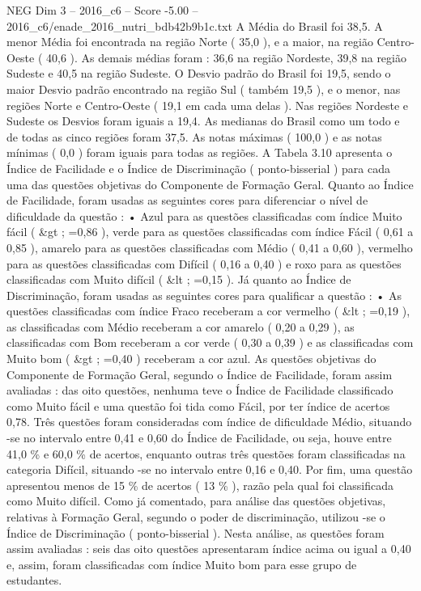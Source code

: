 \begin{textsample}{NEG Dim 3 – 2016\_c6 – Score -5.00 – 2016\_c6/enade\_2016\_nutri\_bdb42b9b1c.txt}
A Média do Brasil foi 38,5.
A menor Média foi encontrada na região Norte ( 35,0 ), e a maior, na região Centro-Oeste ( 40,6 ).
As demais médias foram : 36,6 na região Nordeste, 39,8 na região Sudeste e 40,5 na região Sudeste.
O Desvio padrão do Brasil foi 19,5, sendo o maior Desvio padrão encontrado na região Sul ( também 19,5 ), e o menor, nas regiões Norte e Centro-Oeste ( 19,1 em cada uma delas ).
Nas regiões Nordeste e Sudeste os Desvios foram iguais a 19,4.
As medianas do Brasil como um todo e de todas as cinco regiões foram 37,5.
As notas máximas ( 100,0 ) e as notas mínimas ( 0,0 ) foram iguais para todas as regiões.
A Tabela 3.10 apresenta o Índice de Facilidade e o Índice de Discriminação ( ponto-bisserial ) para cada uma das questões objetivas do Componente de Formação Geral.
Quanto ao Índice de Facilidade, foram usadas as seguintes cores para diferenciar o nível de dificuldade da questão : • Azul para as questões classificadas com índice Muito fácil ( \&gt ; =0,86 ), verde para as questões classificadas com índice Fácil ( 0,61 a 0,85 ), amarelo para as questões classificadas com Médio ( 0,41 a 0,60 ), vermelho para as questões classificadas com Difícil ( 0,16 a 0,40 ) e roxo para as questões classificadas com Muito difícil ( \&lt ; =0,15 ).
Já quanto ao Índice de Discriminação, foram usadas as seguintes cores para qualificar a questão : • As questões classificadas com índice Fraco receberam a cor vermelho ( \&lt ; =0,19 ), as classificadas com Médio receberam a cor amarelo ( 0,20 a 0,29 ), as classificadas com Bom receberam a cor verde ( 0,30 a 0,39 ) e as classificadas com Muito bom ( \&gt ; =0,40 ) receberam a cor azul.
As questões objetivas do Componente de Formação Geral, segundo o Índice de Facilidade, foram assim avaliadas : das oito questões, nenhuma teve o Índice de Facilidade classificado como Muito fácil e uma questão foi tida como Fácil, por ter índice de acertos 0,78.
Três questões foram consideradas com índice de dificuldade Médio, situando -se no intervalo entre 0,41 e 0,60 do Índice de Facilidade, ou seja, houve entre 41,0 \% e 60,0 \% de acertos, enquanto outras três questões foram classificadas na categoria Difícil, situando -se no intervalo entre 0,16 e 0,40.
Por fim, uma questão apresentou menos de 15 \% de acertos ( 13 \% ), razão pela qual foi classificada como Muito difícil.
Como já comentado, para análise das questões objetivas, relativas à Formação Geral, segundo o poder de discriminação, utilizou -se o Índice de Discriminação ( ponto-bisserial ).
Nesta análise, as questões foram assim avaliadas : seis das oito questões apresentaram índice acima ou igual a 0,40 e, assim, foram classificadas com índice Muito bom para esse grupo de estudantes.

\end{textsample}
